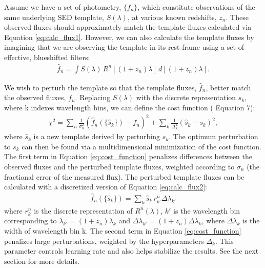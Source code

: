 Assume we have a set of photometry, $\{f_n\}$, which constitute observations of the same underlying SED template, $S(\lambda)$, at various known redshifts, $z_n$. 
These observed fluxes should approximately match the template fluxes calculated via Equation \ref{eq:calc_flux1}. 
However, we can also calculate the template fluxes by imagining that we are observing the template in its rest frame using a set of effective, blueshifted filters:
\begin{align}
    \hat{f}_n = \int S(\lambda) \, R^n[(1+z_n)\lambda] \, d[(1+z_n)\lambda]. \label{eq:calc_flux2}
\end{align}

We wish to perturb the template so that the template fluxes, $\hat{f}_n$, better match the observed fluxes, $f_n$. 
Replacing $S(\lambda)$ with the discrete representation $s_k$, where k indexes wavelength bins, we can define the cost function (\citealt{Budavari2000b} Equation 7):
\begin{align}
    \chi^2 =
    \sum_n \frac{1}{\sigma_n^2}(\hat{f}_n(\{\hat{s}_k\}) - f_n)^2 + 
    \sum_k \frac{1}{\Delta_k^2}(\hat{s}_k - s_k)^2, \label{eq:cost_function}
\end{align}
where $\hat{s}_k$ is a new template derived by perturbing $s_k$.
The optimum perturbation to $s_k$ can then be found via a multidimensional minimization of the cost function. 
The first term in Equation \ref{eq:cost_function} penalizes differences between the observed fluxes and the perturbed template fluxes, weighted according to $\sigma_n$ (the fractional error of the measured flux). 
The perturbed template fluxes can be calculated with a discretized version of Equation \ref{eq:calc_flux2}:
\begin{align}
    \hat{f}_n(\{\hat{s}_k\}) = \sum_k \hat{s}_k \, r_{k'}^n \Delta\lambda_{k'}
\end{align}
where $r_k^n$ is the discrete representation of $R^n(\lambda)$, $k'$ is the wavelength bin corresponding to $\lambda_{k'} = (1+z_n) \lambda_k$ and $\Delta\lambda_{k'} = (1+z_n)\Delta\lambda_k$, where $\Delta\lambda_k$ is the width of wavelength bin k. 
The second term in Equation \ref{eq:cost_function} penalizes large perturbations, weighted by the hyperparameters $\Delta_k$. 
This parameter controls learning rate and also helps stabilize the results. 
See the next section for more details. 

